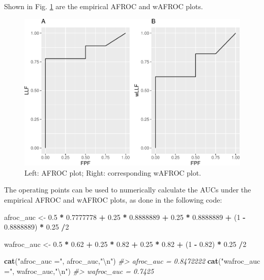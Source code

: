 \documentclass[
]{book}
\newenvironment{Shaded}{\begin{snugshade}}{\end{snugshade}}
\newcommand{\CharTok}[1]{\textcolor[rgb]{0.31,0.60,0.02}{#1}}
\newcommand{\CommentTok}[1]{\textcolor[rgb]{0.56,0.35,0.01}{\textit{#1}}}
\newcommand{\DecValTok}[1]{\textcolor[rgb]{0.00,0.00,0.81}{#1}}
\newcommand{\FloatTok}[1]{\textcolor[rgb]{0.00,0.00,0.81}{#1}}
\newcommand{\KeywordTok}[1]{\textcolor[rgb]{0.13,0.29,0.53}{\textbf{#1}}}
\newcommand{\NormalTok}[1]{#1}
\newcommand{\OperatorTok}[1]{\textcolor[rgb]{0.81,0.36,0.00}{\textbf{#1}}}
\newcommand{\StringTok}[1]{\textcolor[rgb]{0.31,0.60,0.02}{#1}}
\begin{document}
Shown in Fig. \ref{fig:plots-afrocPlot-wafrocPlot} are the empirical AFROC and wAFROC plots.

\begin{figure}
\centering
\includegraphics{03-empirical_files/figure-latex/plots-afrocPlot-wafrocPlot-1.pdf}
\caption{\label{fig:plots-afrocPlot-wafrocPlot}Left: AFROC plot; Right: corresponding wAFROC plot.}
\end{figure}

The operating points can be used to numerically calculate the AUCs under the empirical AFROC and wAFROC plots, as done in the following code:

\begin{Shaded}
\begin{Highlighting}[]
\NormalTok{afroc_auc <-}\StringTok{ }\FloatTok{0.5} \OperatorTok{*}\StringTok{ }\FloatTok{0.7777778} \OperatorTok{+}\StringTok{ }
\StringTok{  }\FloatTok{0.25} \OperatorTok{*}\StringTok{ }\FloatTok{0.8888889} \OperatorTok{+}\StringTok{ }
\StringTok{  }\FloatTok{0.25} \OperatorTok{*}\StringTok{ }\FloatTok{0.8888889} \OperatorTok{+}\StringTok{ }\NormalTok{(}\DecValTok{1} \OperatorTok{-}\StringTok{ }\FloatTok{0.8888889}\NormalTok{) }\OperatorTok{*}\StringTok{ }\FloatTok{0.25} \OperatorTok{/}\DecValTok{2}

\NormalTok{wafroc_auc <-}\StringTok{ }\FloatTok{0.5} \OperatorTok{*}\StringTok{ }\FloatTok{0.62} \OperatorTok{+}\StringTok{ }
\StringTok{  }\FloatTok{0.25} \OperatorTok{*}\StringTok{ }\FloatTok{0.82} \OperatorTok{+}\StringTok{ }
\StringTok{  }\FloatTok{0.25} \OperatorTok{*}\StringTok{ }\FloatTok{0.82} \OperatorTok{+}\StringTok{ }
\StringTok{  }\NormalTok{(}\DecValTok{1} \OperatorTok{-}\StringTok{ }\FloatTok{0.82}\NormalTok{) }\OperatorTok{*}\StringTok{ }\FloatTok{0.25} \OperatorTok{/}\DecValTok{2}

\KeywordTok{cat}\NormalTok{(}\StringTok{"afroc_auc ="}\NormalTok{, afroc_auc,}\StringTok{"}\CharTok{\textbackslash{}n}\StringTok{"}\NormalTok{)}
\CommentTok{#> afroc_auc = 0.8472222}
\KeywordTok{cat}\NormalTok{(}\StringTok{"wafroc_auc ="}\NormalTok{, wafroc_auc,}\StringTok{"}\CharTok{\textbackslash{}n}\StringTok{"}\NormalTok{)}
\CommentTok{#> wafroc_auc = 0.7425}
\end{Highlighting}
\end{Shaded}
\end{document}

